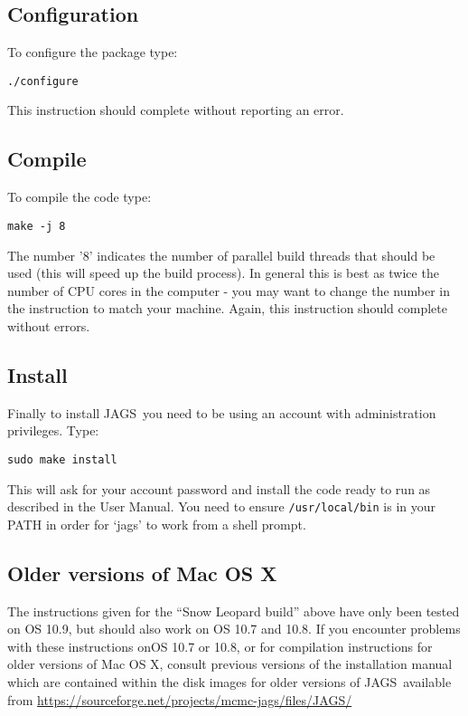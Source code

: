 \documentclass[11pt, a4paper, titlepage]{article}
\newcommand{\JAGS}{\textsf{JAGS}}
\begin{document}
\subsection{Configuration}

To configure the package type:

\begin{verbatim}
./configure
\end{verbatim}

This instruction should complete without reporting an error.

\subsection{Compile}

To compile the code type: 

\begin{verbatim} 
make -j 8 
\end{verbatim} 

The number '8' indicates the number of parallel build threads that
should be used (this will speed up the build process).  In general this
is best as twice the number of CPU cores in the computer - you may want
to change the number in the instruction to match your machine. Again,
this instruction should complete without errors.

\subsection{Install}

Finally to install \JAGS\ you need to be using an account with
administration privileges.  Type: 

\begin{verbatim}
sudo make install
\end{verbatim} 

This will ask for your account password and install the code ready to 
run as described in the User Manual. You need to ensure
\texttt{/usr/local/bin} is in your PATH in order for `jags' to work from
a shell prompt.

\subsection{Older versions of Mac OS X}

The instructions given for the ``Snow Leopard build'' above have only
been tested on OS 10.9, but should also work on OS 10.7 and 10.8.  If
you encounter problems with these instructions onOS 10.7 or 10.8, or for
compilation instructions for older versions of Mac OS X, consult
previous versions of the installation manual which are contained within
the disk images for older versions of \JAGS\ available from
\url{https://sourceforge.net/projects/mcmc-jags/files/JAGS/}
\end{document}
